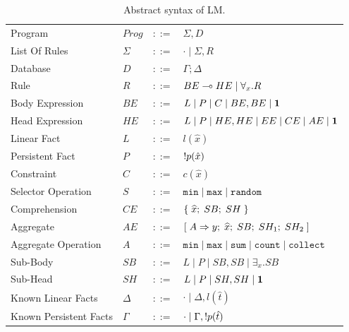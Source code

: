 \begin{table}[h]
\centering
\begin{tabular}{ l l c l }
  Program & $Prog$ & $::=$ & $\Sigma, D$ \\
  List Of Rules & $\Sigma$ & $::=$ & $\cdot \; | \; \Sigma, R$\\
  Database & $D$ & $::=$ & $\Gamma; \Delta$ \\
  Rule & $R$ & $::=$ & $BE \multimap HE \; | \; \forall_{x}. R$ \\
  Body Expression & $BE$ & $::=$ & $L \; | \; P \; | \; C \; | \; BE, BE \; | \; \mathbf{1}$\\
  Head Expression & $HE$ & $::=$ & $L \; | \; P \; | \; HE, HE \; | \; EE \; |
  \; CE \; | \; AE \; | \; \mathbf{1}$\\
  
  Linear Fact & $L$ & $::=$ & $l(\hat{x})$\\
  Persistent Fact & $P$ & $::=$ & ${!} p(\hat{x})$\\
  Constraint & $C$ & $::=$ & $c(\hat{x})$ \\
  Selector Operation & $S$ & $::=$ & $\mathtt{min} \; | \; \mathtt{max} \; | \; \mathtt{random}$\\
  
  Comprehension & $CE$ & $::=$ & $\{ \; \widehat{x}; \; SB; \; SH \; \}$ \\

  Aggregate & $AE$ & $::=$ & $[\; A \Rightarrow y; \; \widehat{x}; \; SB; \; SH_1; \; SH_2 \;]$ \\
  Aggregate Operation & $A$ & $::=$ & $\mathtt{min} \; | \; \mathtt{max} \; | \;
\mathtt{sum} \; | \; \mathtt{count} \; | \; \mathtt{collect}$ \\
  
  Sub-Body & $SB$ & $::=$ & $L \; | \; P \; | \; SB, SB \; | \; \exists_{x}. SB$\\
  Sub-Head & $SH$ & $::=$ & $L \; | \; P \; | \; SH, SH \; | \; \mathbf{1}$\\
  
  Known Linear Facts & $\Delta$ & $::=$ & $\cdot \; | \; \Delta, l(\hat{t})$ \\
  Known Persistent Facts & $\Gamma$ & $::=$ & $\cdot \; | \; \Gamma, {!} p(\hat{t})$ \\
\end{tabular}
\caption{Abstract syntax of LM.}\label{tbl:ast}
\end{table}

